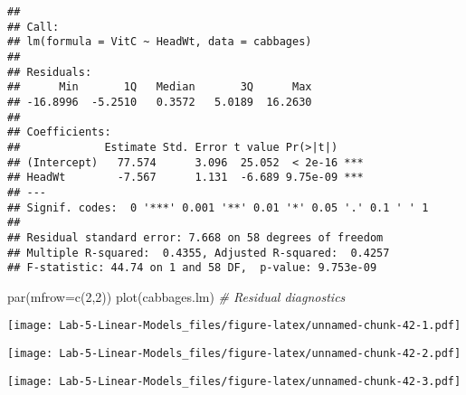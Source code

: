 \documentclass[
]{article}
\newenvironment{Shaded}{\begin{snugshade}}{\end{snugshade}}
\newcommand{\AttributeTok}[1]{\textcolor[rgb]{0.77,0.63,0.00}{#1}}
\newcommand{\CommentTok}[1]{\textcolor[rgb]{0.56,0.35,0.01}{\textit{#1}}}
\newcommand{\DecValTok}[1]{\textcolor[rgb]{0.00,0.00,0.81}{#1}}
\newcommand{\FunctionTok}[1]{\textcolor[rgb]{0.00,0.00,0.00}{#1}}
\newcommand{\NormalTok}[1]{#1}
\newcommand{\SpecialCharTok}[1]{\textcolor[rgb]{0.00,0.00,0.00}{#1}}
\begin{document}
\begin{verbatim}
## 
## Call:
## lm(formula = VitC ~ HeadWt, data = cabbages)
## 
## Residuals:
##      Min       1Q   Median       3Q      Max 
## -16.8996  -5.2510   0.3572   5.0189  16.2630 
## 
## Coefficients:
##             Estimate Std. Error t value Pr(>|t|)    
## (Intercept)   77.574      3.096  25.052  < 2e-16 ***
## HeadWt        -7.567      1.131  -6.689 9.75e-09 ***
## ---
## Signif. codes:  0 '***' 0.001 '**' 0.01 '*' 0.05 '.' 0.1 ' ' 1
## 
## Residual standard error: 7.668 on 58 degrees of freedom
## Multiple R-squared:  0.4355, Adjusted R-squared:  0.4257 
## F-statistic: 44.74 on 1 and 58 DF,  p-value: 9.753e-09
\end{verbatim}

\begin{Shaded}
\begin{Highlighting}[]
\FunctionTok{par}\NormalTok{(}\AttributeTok{mfrow=}\FunctionTok{c}\NormalTok{(}\DecValTok{2}\NormalTok{,}\DecValTok{2}\NormalTok{))}
\FunctionTok{plot}\NormalTok{(cabbages.lm) }\CommentTok{\# Residual diagnostics}
\end{Highlighting}
\end{Shaded}

\texttt{[image: Lab-5-Linear-Models\_files/figure-latex/unnamed-chunk-42-1.pdf]}

\begin{Shaded}
\end{Shaded}

\texttt{[image: Lab-5-Linear-Models\_files/figure-latex/unnamed-chunk-42-2.pdf]}

\begin{Shaded}
\end{Shaded}

\texttt{[image: Lab-5-Linear-Models\_files/figure-latex/unnamed-chunk-42-3.pdf]}
\end{document}
